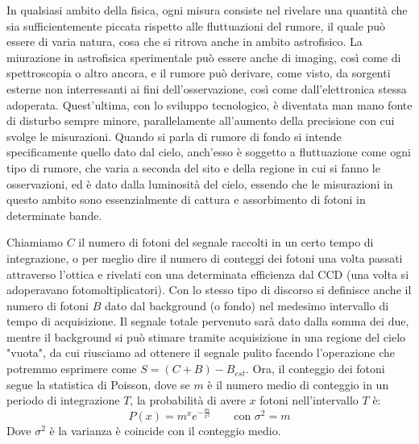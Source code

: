 In qualsiasi ambito della fisica, ogni misura consiste nel rivelare una quantità che sia sufficientemente piccata rispetto alle fluttuazioni del rumore, il quale può essere di varia natura, cosa che si ritrova anche in ambito astrofisico. La miurazione in astrofisica sperimentale può essere anche di imaging, così come di spettroscopia o altro ancora, e il rumore può derivare, come visto, da sorgenti esterne non interressanti ai fini dell'osservazione, così come dall'elettronica stessa adoperata. Quest'ultima, con lo sviluppo tecnologico, è diventata man mano fonte di disturbo sempre minore, parallelamente all'aumento della precisione con cui svolge le misurazioni. Quando si parla di rumore di fondo si intende specificamente quello dato dal cielo, anch'esso è soggetto a fluttuazione come ogni tipo di rumore, che varia a seconda del sito e della regione in cui si fanno le osservazioni, ed è dato dalla luminosità del cielo, essendo che le misurazioni in questo ambito sono essenzialmente di cattura e assorbimento di fotoni in determinate bande.

Chiamiamo $C$ il numero di fotoni del segnale raccolti in un certo tempo di integrazione, o per meglio dire il numero di conteggi dei fotoni una volta passati attraverso l'ottica e rivelati con una determinata efficienza dal CCD (una volta si adoperavano fotomoltiplicatori). Con lo stesso tipo di discorso si definisce anche il numero di fotoni $B$ dato dal background (o fondo) nel medesimo intervallo di tempo di acquisizione. Il segnale totale pervenuto sarà dato dalla somma dei due, mentre il background si può stimare tramite acquisizione in una regione del cielo "vuota", da cui riusciamo ad ottenere il segnale pulito facendo l'operazione che potremmo esprimere come $S=(C+B)-B_{est}$. Ora, il conteggio dei fotoni segue la statistica di Poisson, dove se $m$ è il numero medio di conteggio in un periodo di integrazione $T$, la probabilità di avere $x$ fotoni nell'intervallo $T$ è:
\begin{equation}
    P(x)=m^xe^{-\frac{m}{x^2}} \qquad \text{con } \sigma^2=m
\end{equation}
Dove $\sigma^2$ è la varianza è coincide con il conteggio medio.